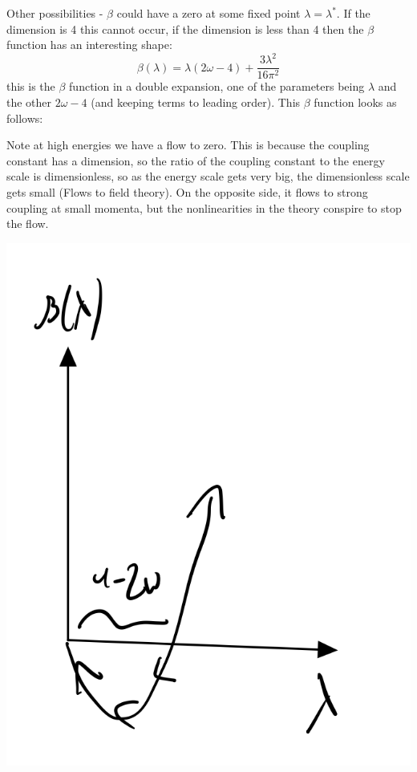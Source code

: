 Other possibilities - $\beta$ could have a zero at some fixed point $\lambda = \lambda^*$. If the dimension is 4 this cannot occur, if the dimension is less than 4 then the $\beta$ function has an interesting shape:
\begin{equation}
    \beta(\lambda) = \lambda(2\omega - 4) + \frac{3\lambda^2}{16\pi^2}
\end{equation}
this is the $\beta$ function in a double expansion, one of the parameters being $\lambda$ and the other $2\omega - 4$ (and keeping terms to leading order). This $\beta$ function looks as follows:

Note at high energies we have a flow to zero. This is because the coupling constant has a dimension, so the ratio of the coupling constant to the energy scale is dimensionless, so as the energy scale gets very big, the dimensionless scale gets small (Flows to field theory). On the opposite side, it flows to strong coupling at small momenta, but the nonlinearities in the theory conspire to stop the flow.

\begin{center}
    \includegraphics[scale=0.4]{Images/fig-lec30p3.png}
\end{center}

